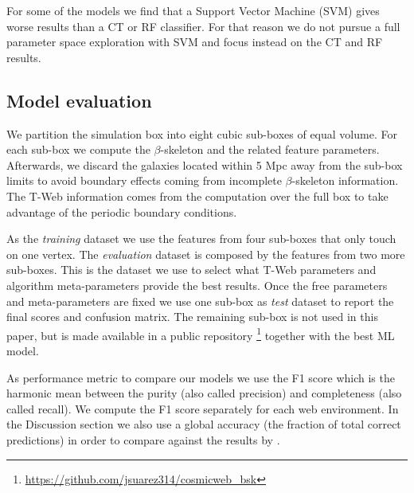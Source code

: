 \documentclass[usenatbib]{mnras}
\begin{document}
For some of the models we find that a Support Vector Machine (SVM) gives worse results than a CT or RF classifier.
For that reason we do not pursue a full parameter space exploration with SVM and focus instead on the CT and RF results.


\subsection{Model evaluation}

We partition the simulation box into eight cubic sub-boxes of equal volume.
For each sub-box we compute the $\beta$-skeleton and the related feature parameters.
Afterwards, we discard the galaxies located within 5 Mpc away from the sub-box limits to avoid boundary effects coming from incomplete $\beta$-skeleton information.
The T-Web information comes from the computation over the full box to take advantage of the periodic boundary conditions.

As the \emph{training} dataset we use the features from four sub-boxes that only touch on one vertex.
The \emph{evaluation} dataset is composed by the features from two more sub-boxes.
This is the dataset we use to select what T-Web parameters and algorithm meta-parameters provide the best results.
Once the free parameters and meta-parameters are fixed we use one sub-box as \emph{test} dataset to report the final scores and confusion matrix.
The remaining sub-box is not used in this paper, but is made available in a public repository \footnote{\url{https://github.com/jsuarez314/cosmicweb_bsk}} together with the best ML model. 


As performance metric to compare our models we use the F1 score which is the harmonic mean between the purity (also called precision) and completeness (also called recall).
We compute the F1 score separately for each web environment.
In the Discussion section we also use a global accuracy (the fraction of total correct predictions) in order to compare against the results by \cite{Tsizh2019}.
\end{document}

